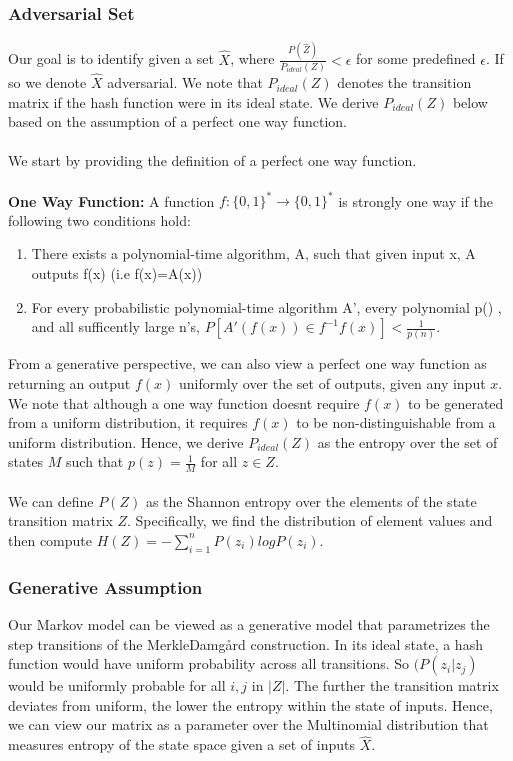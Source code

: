 \documentclass[letterpaper,twocolumn,10pt]{article}
\begin{document}
\subsubsection{Adversarial Set}
Our goal is to identify given a set $\hat{X}$, where $\frac{P(\hat{Z})}{P_{ideal}(Z)} < \epsilon$ for some predefined $\epsilon$. If so we denote $\hat{X}$ adversarial. We note that $P_{ideal}(Z)$ denotes the transition matrix if the hash function were in its ideal state. We derive $P_{ideal}(Z)$ below based on the assumption of a perfect one way function.
\\
\\
We start by providing the definition of a perfect one way function.
\\
\\
\textbf{One Way Function:} A function $f: \{0,1\}^{*} \rightarrow \{0,1\}^{*}$ is strongly one way if the following two conditions hold:
\begin{enumerate}
\item There exists a polynomial-time algorithm, A, such that given input x, A outputs f(x) (i.e f(x)=A(x))
\item For every probabilistic polynomial-time algorithm A', every polynomial p() , and all sufficently large n's, $P[A'(f(x)) \in f^{-1}f(x)] < \frac{1}{p(n)}$.  
\end{enumerate}

From a generative perspective, we can also view a perfect one way function as returning an output $f(x)$ uniformly over the set of outputs, given any input $x$. We note that although a one way function doesnt require $f(x)$ to be generated from a uniform distribution, it requires $f(x)$ to be non-distinguishable from a uniform distribution. Hence, we derive  $P_{ideal}(Z)$ as the entropy over the set of states $M$ such that $p(z) = \frac{1}{M}$ for all $z \in Z$. 
\\
\\
We can define $P(Z)$ as the Shannon entropy over the elements of the state transition matrix $Z$. Specifically, we find the distribution of element values and then compute $H(Z) = -\sum_{i=1}^{n} P(z_{i}) log P(z_{i})$.

\subsubsection{Generative Assumption}
Our Markov model can be viewed as a generative model that parametrizes the step transitions of the Merkle{\textendash}Damg\r{a}rd construction. In its ideal state, a hash function would have uniform probability across all transitions. So $(P(z_{i} | z_{j})$ would be uniformly probable for all $i,j$ in $|Z|$. The further the transition matrix deviates from uniform, the lower the entropy within the state of inputs. Hence, we can view our matrix as a parameter over the Multinomial distribution that measures entropy of the state space given a set of inputs $\hat{X}$.
\end{document}
